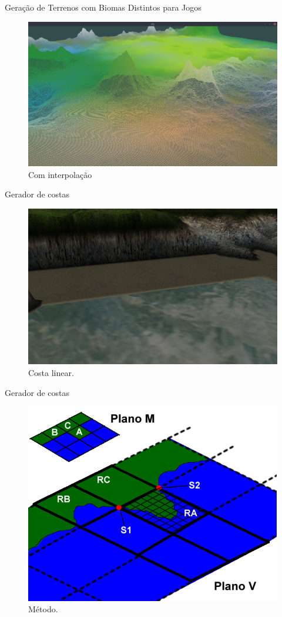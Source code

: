 \begin{frame}{Geração de Terrenos com Biomas Distintos para Jogos}
    \begin{figure}
		\centering
        \includegraphics[width=.8\textwidth]{img/uffs/interpolationArea/interpolation.png}
        \caption{Com interpolação}
    \end{figure}
\end{frame}


\begin{frame}{Gerador de costas}
    \begin{figure}
		\centering
        \includegraphics[width=.8\textwidth]{img/uffs/fernando/linearcosta.png}
        \caption{Costa linear.}
    \end{figure}
\end{frame}

\begin{frame}{Gerador de costas}
    \begin{figure}
		\centering
        \includegraphics[width=.8\textwidth]{img/uffs/fernando/metodo.png}
        \caption{Método.}
    \end{figure}
\end{frame}

